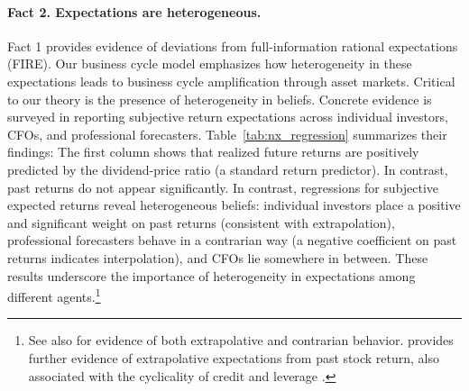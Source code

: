 


\paragraph{Fact 2. Expectations are heterogeneous.}
Fact 1 provides evidence of deviations from full-information rational expectations (FIRE). 
Our business cycle model emphasizes how heterogeneity in these expectations leads to business cycle amplification through asset markets. 
Critical to our theory is the presence of heterogeneity in beliefs. 
Concrete evidence is surveyed in \citet{nagel2023dynamics} reporting subjective return expectations across individual investors, CFOs, and professional forecasters. 
Table~\ref{tab:nx_regression} summarizes their findings: The first column shows that realized future returns are positively predicted by the dividend-price ratio (a standard return predictor). 
In contrast, past returns do not appear significantly. 
In contrast, regressions for subjective expected returns reveal heterogeneous beliefs: individual investors place a positive and significant weight on past returns (consistent with extrapolation), professional forecasters behave in a contrarian way (a negative coefficient on past returns indicates interpolation), and CFOs lie somewhere in between. 
These results underscore the importance of heterogeneity in expectations among different agents.\footnote{
    See also \citet{atmaz2023contrarians} for evidence of both extrapolative and contrarian behavior. 
    \citet{greenwood_expectations_2014} provides further evidence of extrapolative expectations from past stock return, also associated with the cyclicality of credit and leverage \citep{lopez2017credit}.} 


